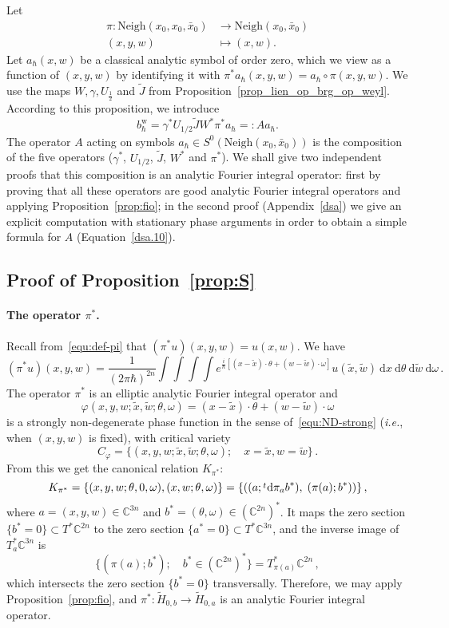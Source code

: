 \documentclass{article}
\newcommand{\Vois}{\mathrm{Neigh}}
\newcommand{\w}{\mathrm{w}}
\newcommand{\DD}{\:\!\mathrm{d}}
\newcommand{\trsp}{\raisebox{.6ex}{${\scriptstyle t}$}}
\newcommand{\phy}{\varphi}
\newcommand{\intint}{\int\!\!\!\!\int}
\newcommand{\CM}{\mathbb{C}}
\newcommand{\h}{\hbar}
\begin{document}
Let
\begin{align}
  \label{equ:def-pi}
  \pi : \Vois \left( x_0, x_0, \bar{x}_0 \right) 
  & \longrightarrow \Vois (x_0, \bar{x}_0) \\
  (x, y, w) & \longmapsto (x, w).
\end{align}
Let $a_{ \hbar}(x, w)$ be a classical analytic symbol of order zero,
which we view as a function of $(x, y, w)$ by identifying it with
$ \pi^* a_{ \hbar}(x, y, w) = a_{ \hbar} \circ \pi (x, y, w)$. We use
the maps $W,\gamma,U_{\frac{1}{2}}$ and $\tilde J$ from
Proposition~\ref{prop_lien_op_brg_op_weyl}.  According to this
proposition, we introduce
\begin{equation}
  \label{equ:defA} 
  b^{\w}_{ \hbar} = \gamma^* U_{1/2}
  \tilde{J} W^* \pi^* a_{ \hbar} =: A a_{ \hbar}.
\end{equation}
The operator $A$ acting on symbols
$a_\h\in S^0(\Vois (x_0, \bar{x}_0))$ is the composition of the five
operators ($ \gamma^*$, $U_{1/2}$, $\tilde J$, $ W^*$ and $ \pi^*$).
We shall give two independent proofs that this composition is an
analytic Fourier integral operator: first by proving that all these
operators are good analytic Fourier integral operators and applying
Proposition~\ref{prop:fio}; in the second proof (Appendix~\ref{dsa})
we give an explicit computation with stationary phase arguments in
order to obtain a simple formula for $A$ (Equation~\eqref{dsa.10}).



\subsection{Proof of Proposition~\ref{prop:S}}
\label{sec:transco}
\paragraph{The operator $\pi^*$.}
Recall from~\eqref{equ:def-pi} that $(\pi^*u)(x,y,w)=u(x,w)$. We have
\[
(\pi^*u)(x,y,w) = \frac{1}{(2\pi\h)^{2n}}\intint\!\!\!\!\intint
e^{\frac{i}{\h}[(x-\tilde x)\cdot\theta + (w-\tilde w)\cdot\omega]}
u(\tilde x,\tilde w)\DD x \DD \theta \DD \tilde w \DD \omega\,.
\]
The operator $\pi^*$ is an elliptic analytic Fourier integral operator
and
\[
\phy(x,y,w;\tilde x, \tilde w; \theta, \omega) = (x-\tilde
x)\cdot\theta + (w-\tilde w)\cdot\omega
\]
 is a strongly non-degenerate
phase function in the sense of~\eqref{equ:ND-strong} (\emph{i.e.},
when $(x,y,w)$ is fixed), with critical variety
\[
C_\phy = \{(x,y,w;\tilde x, \tilde w; \theta, \omega); \quad x =
\tilde x, w = \tilde w\}\,.
\]
From this we get the canonical relation $K_{\pi^*}$:
\[
K_{\pi^*} = \{(x,y,w;\theta,0,\omega), (x,w;\theta,\omega)\} =
\{\left( (a; \trsp\DD\pi_a b^*),\; (\pi(a); b^*) \right)\}\,,
\]
where $a=(x,y,w)\in\CM^{3n}$ and
$b^*=(\theta,\omega)\in(\CM^{2n})^*$. It maps the zero section
$\{b^*=0\}\subset T^*\CM^{2n}$ to the zero section
$\{a^*=0\}\subset T^*\CM^{3n}$, and the inverse image of
$T^*_a\CM^{3n}$ is
\[
\{(\pi(a);b^*); \quad b^*\in(\CM^{2n})^*\} = T^*_{\pi(a)}\CM^{2n}\,,
\]
which intersects the zero section $\{b^*=0\}$ transversally.
Therefore, we may apply Proposition~\ref{prop:fio}, and
$\pi^*: \widetilde{H}_{0,b}\to \widetilde H_{0,a}$ is an analytic
Fourier integral operator.
\end{document}
